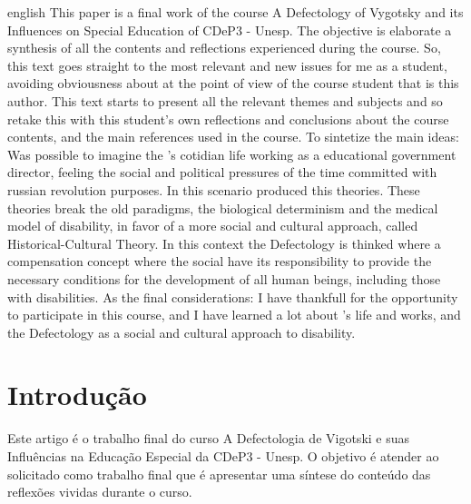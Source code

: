 \documentclass{../../common-shared/cls/Article_Class_RevInfor}
\begin{document}

\begin{resumo}[Abstract]
\begin{otherlanguage*}{english}
This paper is a final work of the course A Defectology of Vygotsky and its Influences on Special Education of CDeP3 - Unesp. The objective is elaborate a synthesis of all the contents and reflections experienced during the course.
So, this text goes straight to the most relevant and new issues for me as a student, avoiding obviousness about \Vig{} at the point of view of the course student that is this author.
This text starts to present all the relevant themes and subjects and so retake this with this student's own reflections and conclusions about the course contents, and the main references used in the course.
To sintetize the main ideas: Was possible to imagine the \Vig{}'s cotidian life working as a educational government director, feeling the social and political pressures of the time committed with russian revolution purposes. In this scenario \Vig{} produced this theories.
These theories break the old paradigms, the biological determinism and the medical model of disability, in favor of a more social and cultural approach, called Historical-Cultural Theory. In this context the Defectology is thinked where a compensation concept where the social have its responsibility to provide the necessary conditions for the development of all human beings, including those with disabilities.
As the final considerations: I have thankfull for the opportunity to participate in this course, and I have learned a lot about \Vig{}'s life and works, and the Defectology as a social and cultural approach to disability.
\end{otherlanguage*}
\end{resumo}



\textual

\section{Introdução}
Este artigo é o trabalho final do curso A Defectologia de Vigotski e
suas Influências na Educação Especial da CDeP3 - Unesp. O objetivo é
atender ao solicitado como trabalho final que é apresentar uma síntese
do conteúdo das reflexões vividas durante o curso.
\end{document}
